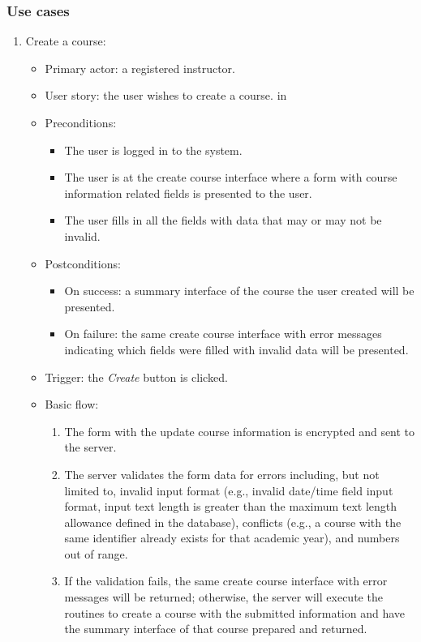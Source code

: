 \subsubsection{Use cases}
\begin{enumerate}
\item Create a course:
\begin{itemize}
    \item Primary actor: a registered instructor.
    \item User story: the user wishes to create a course.
     in
    \item Preconditions: 
        \begin{itemize}
            \item The user is logged in to the system.
            \item The user is at the create course interface where a form with
                course information related fields 
                is presented to the user.
            \item The user fills in all the fields with data that may or
                may not be invalid.
        \end{itemize}
    \item Postconditions:
        \begin{itemize}
            \item On success: a summary interface of the course the user created
                will be presented.
            \item On failure: the same create course interface with error
                messages indicating which fields were filled with invalid data
                will be presented.
        \end{itemize}
    \item Trigger: the \emph{Create} button is clicked.
    \item Basic flow:
        \begin{enumerate}
            \item The form with the update course information is encrypted and
                sent to the server.
            \item The server validates the form data for errors including,
                but not limited to,
                invalid input format
                (e.g., invalid date/time field input format,
                input text length is greater than the maximum text length
                allowance defined in the database),
                conflicts (e.g., a course with the same identifier  
                already exists for that academic year),
                and numbers out of range.
            \item If the validation fails, the same create course interface
                with error messages will be returned; otherwise, the server will
                execute the routines to create a course with the submitted 
                information and have the summary interface of that course prepared
                and returned.
        \end{enumerate}
\end{itemize}


\end{enumerate}
